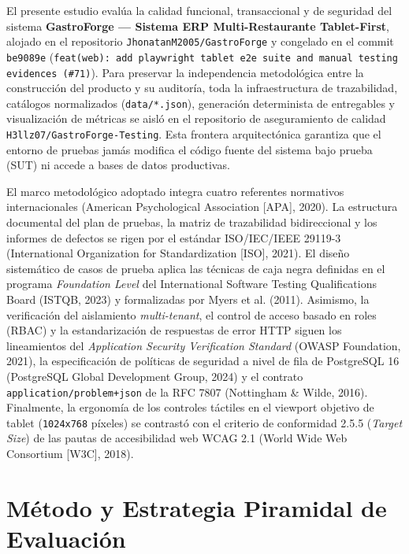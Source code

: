 \documentclass[stu,12pt,a4paper]{apa7}
\begin{document}
El presente estudio evalúa la calidad funcional, transaccional y de seguridad del sistema \textbf{GastroForge --- Sistema ERP Multi-Restaurante Tablet-First}, alojado en el repositorio \texttt{JhonatanM2005/\allowbreak{}GastroForge} y congelado en el commit \texttt{be9089e} (\texttt{feat(\allowbreak{}web)\allowbreak{}:\allowbreak{} add playwright ta\allowbreak{}blet e2e suite and\allowbreak{} manual testing ev\allowbreak{}idences (\allowbreak{}\#71)\allowbreak{}}). Para preservar la independencia metodológica entre la construcción del producto y su auditoría, toda la infraestructura de trazabilidad, catálogos normalizados (\texttt{data/\allowbreak{}*.\allowbreak{}json}), generación determinista de entregables y visualización de métricas se aisló en el repositorio de aseguramiento de calidad \texttt{H3llz07/\allowbreak{}GastroForge-{}\allowbreak{}Testing}. Esta frontera arquitectónica garantiza que el entorno de pruebas jamás modifica el código fuente del sistema bajo prueba (SUT) ni accede a bases de datos productivas.

El marco metodológico adoptado integra cuatro referentes normativos internacionales (American Psychological Association {[}APA{]}, 2020). La estructura documental del plan de pruebas, la matriz de trazabilidad bidireccional y los informes de defectos se rigen por el estándar ISO/IEC/IEEE 29119-3 (International Organization for Standardization {[}ISO{]}, 2021). El diseño sistemático de casos de prueba aplica las técnicas de caja negra definidas en el programa \emph{Foundation Level} del International Software Testing Qualifications Board (ISTQB, 2023) y formalizadas por Myers et al. (2011). Asimismo, la verificación del aislamiento \emph{multi-tenant}, el control de acceso basado en roles (RBAC) y la estandarización de respuestas de error HTTP siguen los lineamientos del \emph{Application Security Verification Standard} (OWASP Foundation, 2021), la especificación de políticas de seguridad a nivel de fila de PostgreSQL 16 (PostgreSQL Global Development Group, 2024) y el contrato \texttt{application/\allowbreak{}problem+json} de la RFC 7807 (Nottingham \& Wilde, 2016). Finalmente, la ergonomía de los controles táctiles en el viewport objetivo de tablet (\texttt{1024x768} píxeles) se contrastó con el criterio de conformidad 2.5.5 (\emph{Target Size}) de las pautas de accesibilidad web WCAG 2.1 (World Wide Web Consortium {[}W3C{]}, 2018).

\section{Método y Estrategia Piramidal de Evaluación}\label{muxe9todo-y-estrategia-piramidal-de-evaluaciuxf3n}
\end{document}
